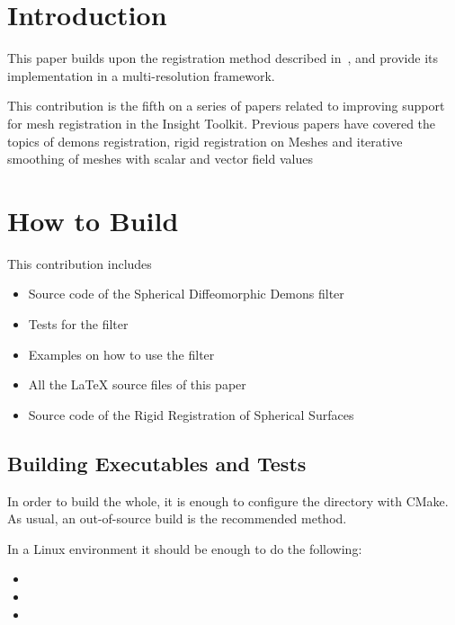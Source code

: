 \documentclass{InsightArticle}
\begin{document}
\tableofcontents

\section{Introduction}

This paper builds upon the registration method described
in~\cite{MeshDemonsRegistrationIJ2009}, and provide its implementation in a
multi-resolution framework.

This contribution is the fifth on a series of papers related to improving
support for mesh registration in the Insight Toolkit. Previous papers have
covered the topics of demons registration, rigid registration on Meshes and
iterative smoothing of meshes with scalar and vector field values
~\cite{MeshSmoothingIJ2009,MeshRigidRegistrationIJ2009,MeshDemonsRegistrationIJ2009} 

\section{How to Build}

This contribution includes

\begin{itemize}
\item Source code of the Spherical Diffeomorphic Demons filter
\item Tests for the filter
\item Examples on how to use the filter
\item All the LaTeX source files of this paper
\item Source code of the Rigid Registration of Spherical Surfaces
\end{itemize}

\subsection{Building Executables and Tests}

In order to build the whole, it is enough to configure the directory with
CMake. As usual, an out-of-source build is the recommended method.

In a Linux environment it should be enough to do the following:

\begin{itemize}
\item {}
\item {}
\item {}
\end{itemize}
\end{document}
